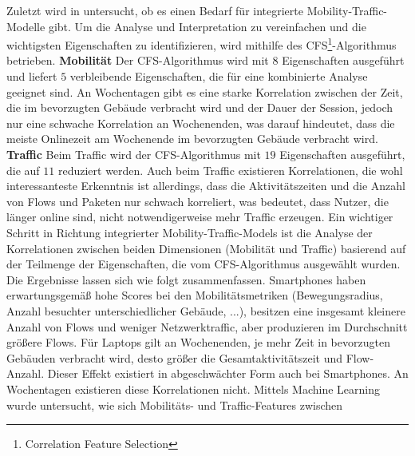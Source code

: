 \documentclass[12pt, a4paper]{article}
\begin{document}
Zuletzt wird in \cite{Alipour2018} untersucht, ob es einen Bedarf für integrierte Mobility-Traffic-Modelle gibt.
Um die Analyse und Interpretation zu vereinfachen und die wichtigsten Eigenschaften zu identifizieren,
wird mithilfe des \textsc{CFS}\footnote{Correlation Feature Selection}-Algorithmus  betrieben. 
\newline\newline
\textbf{Mobilität}\newline
Der \textsc{CFS}-Algorithmus wird mit $8$ Eigenschaften ausgeführt
und liefert $5$ verbleibende Eigenschaften, die für eine kombinierte Analyse geeignet sind.
An Wochentagen gibt es eine starke Korrelation zwischen der Zeit, die im bevorzugten Gebäude 
verbracht wird und der Dauer der Session, jedoch nur eine schwache Korrelation an Wochenenden, was darauf hindeutet,
dass die meiste Onlinezeit am Wochenende im bevorzugten Gebäude verbracht wird.
\newline\newline
\textbf{Traffic}\newline
Beim Traffic wird der \textsc{CFS}-Algorithmus mit $19$ Eigenschaften ausgeführt, die auf $11$
reduziert werden. Auch beim Traffic existieren Korrelationen, die wohl interessanteste Erkenntnis ist allerdings, dass die
Aktivitätszeiten und die Anzahl von Flows und Paketen nur schwach korreliert, was bedeutet, dass Nutzer,
die länger online sind, nicht notwendigerweise mehr Traffic erzeugen.
\newline\newline
Ein wichtiger Schritt in Richtung integrierter Mobility-Traffic-Models ist die Analyse der Korrelationen
zwischen beiden Dimensionen (Mobilität und Traffic) basierend auf der Teilmenge der Eigenschaften,
die vom \textsc{CFS}-Algorithmus ausgewählt wurden.\newline
Die Ergebnisse lassen sich wie folgt zusammenfassen. Smartphones haben erwartungsgemäß hohe Scores bei den Mobilitätsmetriken (Bewegungsradius,
Anzahl besuchter unterschiedlicher Gebäude, ...), besitzen eine
insgesamt kleinere Anzahl von Flows und weniger Netzwerktraffic, aber produzieren im Durchschnitt größere Flows.
Für Laptops gilt an Wochenenden, je mehr Zeit in bevorzugten Gebäuden verbracht wird, desto größer die Gesamtaktivitätszeit
und Flow-Anzahl. Dieser Effekt existiert in abgeschwächter Form auch bei Smartphones. 
An Wochentagen existieren diese Korrelationen nicht.\newline
Mittels Machine Learning wurde untersucht, wie sich Mobilitäts- und Traffic-Features zwischen
\end{document}

